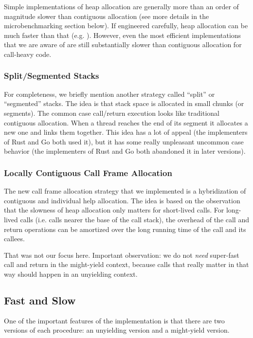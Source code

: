 \documentclass[10pt,preprint]{sigplanconf}
\begin{document}
Simple implementations of heap allocation are generally more than an order of magnitude slower than contiguous allocation (see more details in the microbenchmarking section below).
If engineered carefully, heap allocation can be much faster than that (e.g. \cite{Shao2000}).
However, even the most efficient implementations that we are aware of are still substantially slower than contiguous allocation for call-heavy code.

\subsubsection{Split/Segmented Stacks}

For completeness, we briefly mention another strategy called ``split'' or ``segmented'' stacks.
The idea is that stack space is allocated in small chunks (or segments).
The common case call/return execution looks like traditional contiguous allocation.
When a thread reaches the end of its segment it allocates a new one and links them together.
This idea has a lot of appeal (the implementers of Rust and Go both used it), but it has some really unpleasant uncommon case behavior (the implementers of Rust and Go both
abandoned it in later versions).

\subsubsection{Locally Contiguous Call Frame Allocation}

The new call frame allocation strategy that we implemented is a hybridization of contiguous and individual help allocation.
The idea is based on the observation that the slowness of heap allocation only matters for short-lived calls.
For long-lived calls (i.e. calls nearer the base of the call stack), the overhead of the call and return operations can be amortized over the long running time of the call and its callees.

That was not our focus here.  Important
observation: we do not \emph{need} super-fast call and return in the
might-yield context, because calls that really matter in that way should
happen in an unyielding context.


\subsection{Fast and Slow}

One of the important features of the implementation is that there are
two versions of each procedure: an unyielding version and a might-yield
version.
\end{document}

